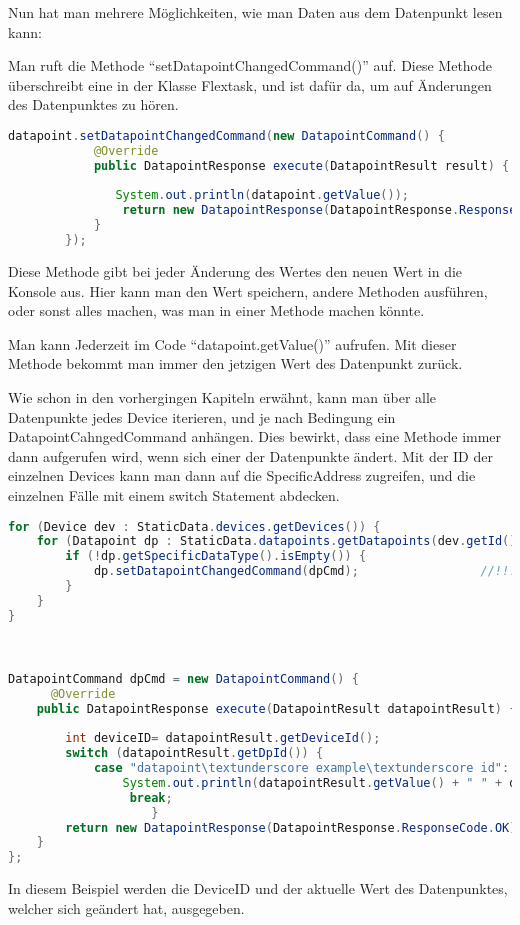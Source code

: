 Nun hat man mehrere Möglichkeiten, wie man Daten aus dem Datenpunkt lesen kann: 
\begin{compactenum}
    \item Man ruft die Methode “setDatapointChangedCommand()” auf. Diese Methode überschreibt eine in der Klasse Flextask, und ist dafür da, um auf Änderungen des Datenpunktes zu hören.
    \begin{lstlisting}[language=java,caption=Example catapoint usage,label=lst:impl:foo]
        datapoint.setDatapointChangedCommand(new DatapointCommand() { 
            @Override 
            public DatapointResponse execute(DatapointResult result) { 
         
               System.out.println(datapoint.getValue()); 
                return new DatapointResponse(DatapointResponse.ResponseCode.OK); 
            } 
        }); 
    \end{lstlisting}
    Diese Methode gibt bei jeder Änderung des Wertes den neuen Wert in die Konsole aus. Hier kann man den Wert speichern, andere Methoden ausführen, oder sonst alles machen, was man in einer Methode machen könnte.

    \item Man kann Jederzeit im Code “datapoint.getValue()” aufrufen. Mit dieser Methode bekommt man immer den jetzigen Wert des Datenpunkt zurück.
    \item Wie schon in den vorhergingen Kapiteln erwähnt, kann man über alle Datenpunkte jedes Device iterieren, und je nach Bedingung ein DatapointCahngedCommand anhängen. Dies bewirkt, dass eine Methode immer dann aufgerufen wird, wenn sich einer der Datenpunkte ändert. Mit der ID der einzelnen Devices kann man dann auf die SpecificAddress zugreifen, und die einzelnen Fälle mit einem switch Statement abdecken.
    \begin{lstlisting}[language=java,caption=Example multible datapoint usage,label=lst:impl:foo]
        for (Device dev : StaticData.devices.getDevices()) { 
    for (Datapoint dp : StaticData.datapoints.getDatapoints(dev.getId())) { 
        if (!dp.getSpecificDataType().isEmpty()) { 
            dp.setDatapointChangedCommand(dpCmd);                 //!!! 
        } 
    } 
} 

 

DatapointCommand dpCmd = new DatapointCommand() { 
      @Override 
    public DatapointResponse execute(DatapointResult datapointResult) { 
 
        int deviceID= datapointResult.getDeviceId();  
        switch (datapointResult.getDpId()) { 
            case "datapoint\textunderscore example\textunderscore id": 
                System.out.println(datapointResult.getValue() + " " + deviceID ); 
                 break; 
                    } 
        return new DatapointResponse(DatapointResponse.ResponseCode.OK); 
    } 
}; 

    \end{lstlisting}
    In diesem Beispiel werden die DeviceID und der aktuelle Wert des Datenpunktes, welcher sich geändert hat, ausgegeben.
\end{compactenum}

